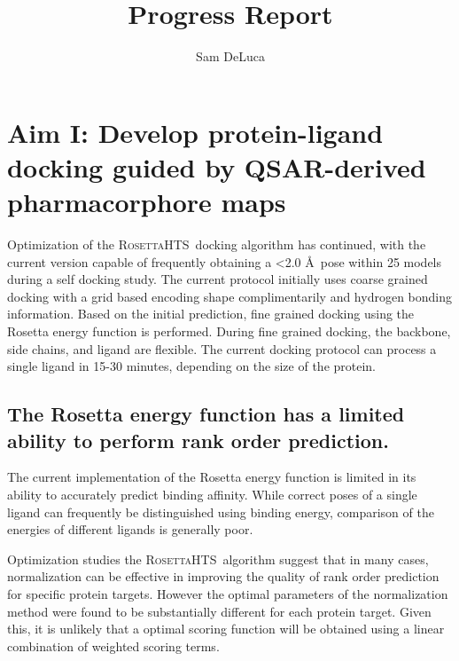 \documentclass[11pt, oneside]{article}   	%
\title{Progress Report}
\author{Sam DeLuca}
\newcommand{\rhts}{\textsc{RosettaHTS}\ }
\begin{document}
\maketitle
\section{Aim I: Develop protein-ligand docking guided by QSAR-derived pharmacorphore maps}
Optimization of the \rhts docking algorithm has continued, with the current version capable of frequently obtaining a \textless 2.0 \AA\ pose within 25 models during a self docking study.
The current protocol initially uses coarse grained docking with a grid based encoding shape complimentarily and hydrogen bonding information.  
Based on the initial prediction, fine grained docking using the Rosetta energy function is performed.  
During fine grained docking, the backbone, side chains, and ligand are flexible. 
The current docking protocol can process a single ligand in 15-30 minutes, depending on the size of the protein.

\subsection{The Rosetta energy function has a limited ability to perform rank order prediction.}
The current implementation of the Rosetta energy function is limited in its ability to accurately predict binding affinity.
While correct poses of a single ligand can frequently be distinguished using binding energy\citep{Davis:2009fx}, comparison of the energies of different ligands is generally poor\citep{Kaufmann:2009cq}.

Optimization studies the \rhts algorithm suggest that in many cases, normalization can be effective in improving the quality of rank order prediction for specific protein targets.  
However the optimal parameters of the normalization method were found to be substantially different for each protein target.  
Given this, it is unlikely that a optimal scoring function will be obtained using a linear combination of weighted scoring terms. 
\end{document}
